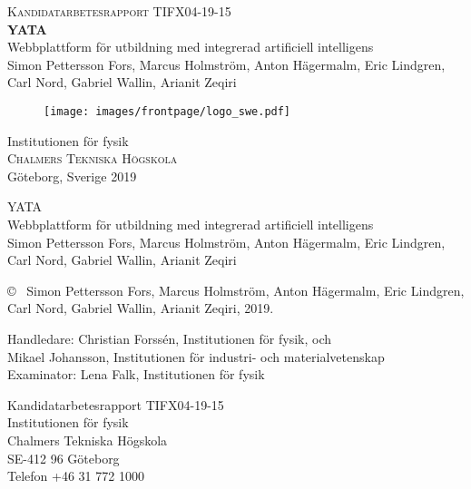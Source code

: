\newpage
\thispagestyle{empty}
\begin{center}
	\textsc{\large Kandidatarbetesrapport TIFX04-19-15}\\[4cm]		%
	\textbf{\Large YATA} \\[1cm]
	{\large Webbplattform för utbildning med integrerad artificiell intelligens}\\[1cm]
	{\large Simon Pettersson Fors, Marcus Holmström, Anton Hägermalm, Eric Lindgren, Carl Nord, Gabriel Wallin, Arianit Zeqiri}
	
	\vfill	
	\begin{figure}[H]
	\centering
	\texttt{[image: images/frontpage/logo\_swe.pdf]} \\	
	\end{figure}	\vspace{5mm}	
	Institutionen för fysik \\
	\textsc{Chalmers Tekniska Högskola} \\
	Göteborg, Sverige 2019 \\
\end{center}

\newpage
\thispagestyle{plain}
\vspace*{4.5cm}
\noindent YATA\\
Webbplattform för utbildning med integrerad artificiell intelligens\\
Simon Pettersson Fors, Marcus Holmström, Anton Hägermalm, Eric Lindgren, Carl Nord, Gabriel Wallin, Arianit Zeqiri \setlength{\parskip}{1cm}

\noindent \copyright ~ Simon Pettersson Fors, Marcus Holmström, Anton Hägermalm, Eric Lindgren, Carl Nord, Gabriel Wallin, Arianit Zeqiri, 2019.

\noindent Handledare: Christian Forssén, Institutionen för fysik, och \\
        \hspace*{61px} Mikael Johansson, Institutionen för industri- och materialvetenskap\\
Examinator: Lena Falk, Institutionen för fysik \setlength{\parskip}{1cm}

\noindent Kandidatarbetesrapport TIFX04-19-15\\	%
Institutionen för fysik\\
Chalmers Tekniska Högskola\\
SE-412 96 Göteborg\\
Telefon +46 31 772 1000 \setlength{\parskip}{0.5cm}

